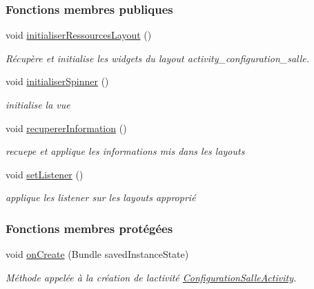 \subsubsection*{Fonctions membres publiques}
\begin{DoxyCompactItemize}
\item 
void \hyperlink{classcom_1_1lasalle_1_1meeting_1_1_configuration_salle_activity_a24314b86f87df50bb933484d1d1435ac}{initialiser\+Ressources\+Layout} ()
\begin{DoxyCompactList}\small\item\em Récupère et initialise les widgets du layout activity\+\_\+configuration\+\_\+salle. \end{DoxyCompactList}\item 
void \hyperlink{classcom_1_1lasalle_1_1meeting_1_1_configuration_salle_activity_ac0b88ac36a5ee40988f3ee8fea7c54ee}{initialiser\+Spinner} ()
\begin{DoxyCompactList}\small\item\em initialise la vue \end{DoxyCompactList}\item 
void \hyperlink{classcom_1_1lasalle_1_1meeting_1_1_configuration_salle_activity_a6c5c3c9c513b13eb9182573732d392f5}{recuperer\+Information} ()
\begin{DoxyCompactList}\small\item\em recuepe et applique les informations mis dans les layouts \end{DoxyCompactList}\item 
void \hyperlink{classcom_1_1lasalle_1_1meeting_1_1_configuration_salle_activity_a8d3eea01718b9535c88caa796d8b6377}{set\+Listener} ()
\begin{DoxyCompactList}\small\item\em applique les listener sur les layouts approprié \end{DoxyCompactList}\end{DoxyCompactItemize}
\subsubsection*{Fonctions membres protégées}
\begin{DoxyCompactItemize}
\item 
void \hyperlink{classcom_1_1lasalle_1_1meeting_1_1_configuration_salle_activity_a202931e45bdc0f81c3f0518a6b28e712}{on\+Create} (Bundle saved\+Instance\+State)
\begin{DoxyCompactList}\small\item\em Méthode appelée à la création de l\textquotesingle{}activité \hyperlink{classcom_1_1lasalle_1_1meeting_1_1_configuration_salle_activity}{Configuration\+Salle\+Activity}. \end{DoxyCompactList}\end{DoxyCompactItemize}
